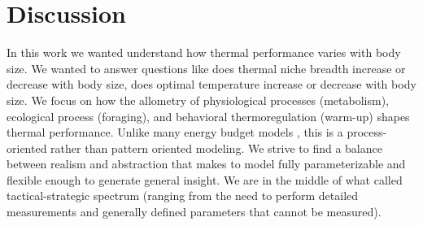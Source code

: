 \section*{Discussion}
In this work we wanted understand how thermal performance varies with body size.
We wanted to answer questions like does thermal niche breadth increase or decrease with body size, does optimal temperature increase or decrease with body size.
We focus on how the allometry of physiological processes (metabolism), ecological process (foraging), and behavioral thermoregulation (warm-up) shapes thermal performance. 
Unlike many energy budget models \citep[e.g.,][]{Brown1993,Kooijmann2009}, this is a process-oriented rather than pattern oriented modeling.
We strive to find a balance between realism and abstraction that makes to model fully parameterizable and flexible enough to generate general insight.
We are in the middle of what \citet{Hooling1966} called tactical-strategic spectrum (ranging from the need to perform detailed measurements and generally defined parameters that cannot be measured).

